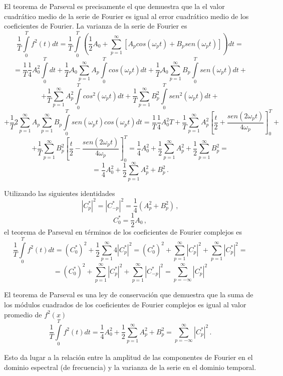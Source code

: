 \documentclass[
]{agujournal2019}
\begin{document}
El teorema de Parseval es precisamente el que demuestra que la el valor
cuadrático medio de la serie de Fourier es igual al error cuadrático
medio de los coeficientes de Fourier. La varianza de la serie de Fourier
es \[\frac{1}{T}\int\limits^{T}_0 f^2(t) dt=\frac{1}{T}\int\limits^{T}_0
\left(\frac{1}{2}A_0 +\sum\limits^\infty_{p=1}[A_p cos(\omega_p t) + B_p sen(\omega_p t)]\right) dt=\]
\[=\frac{1}{T}\frac{1}{4} A^2_0 \int\limits^{T}_0 dt + \frac{1}{T}A_0 \sum\limits^\infty_{p=1} A_p \int\limits^{T}_0 cos(\omega_p t)dt + \frac{1}{T}A_0\sum\limits^\infty_{p=1}B_p \int\limits^{T}_0 sen(\omega_p t)dt +\]
\[+\frac{1}{T}\sum\limits^\infty_{p=1}A^2_p \int\limits^{T}_0 cos^2(\omega_p t)dt +
\frac{1}{T}\sum\limits^\infty_{p=1}B^2_p \int\limits^{T}_0 sen^2(\omega_p t)dt+\]
\[+\frac{1}{T}2\sum\limits^\infty_{p=1}A_p \sum\limits^\infty_{p=1}B_p\int\limits^{T}_0 sen(\omega_p t)cos(\omega_p t)dt=
\frac{1}{T}\frac{1}{4}A^2_0 T + \frac{1}{T}\sum\limits^\infty_{p=1}A^2_p\left[ \frac{t}{2} + \frac{sen(2\omega_p t)}{4\omega_p}\right]^T_0+\]
\[+\frac{1}{T}\sum\limits^\infty_{p=1}B^2_p\left[ \frac{t}{2} - \frac{sen(2\omega_p t)}{4\omega_p}\right]^T_0=
\frac{1}{4}A^2_0 + \frac{1}{2}\sum\limits^\infty_{p=1}A_p^2 + \frac{1}{2}\sum\limits^\infty_{p=1}B_p^2=\]
\[=\frac{1}{4}A^2_0 + \frac{1}{2}\sum\limits^\infty_{p=1} A_p^2 + B_p^2\,.\]

Utilizando las siguientes identidades
\[|C^*_p|^2=|C^*_{-p}|^2=\frac{1}{4}(A_p^2 + B_p^2)\,,\]
\[C^*_0=\frac{1}{2}A_0\,,\] el teorema de Parseval en términos de los
coeficientes de Fourier complejos es
\[\frac{1}{T}\int\limits^{T}_0 f^2(t) dt=(C^*_0)^2 + \frac{1}{2}\sum\limits^\infty_{p=1} 4|C^*_p|^2=
(C^*_0)^2 + \sum\limits^\infty_{p=1} |C^*_p|^2 + \sum\limits^\infty_{p=1} |C^*_p|^2=\]
\[=(C^*_0)^2 + \sum\limits^\infty_{p=1} |C^*_p|^2 + \sum\limits^\infty_{p=1} |C^*_{-p}|^2=
\sum\limits^\infty_{p=-\infty} |C^*_p|^2\]

\newpage

\begin{framed}
El teorema de Parseval es una
ley de conservación que demuestra que la suma de los módulos cuadrados
de los coeficientes de Fourier complejos es igual al valor promedio de
$f^2(x)$
$$\frac{1}{T}\int\limits^{T}_0 f^2(t) dt=\frac{1}{4}A^2_0 + \frac{1}{2}\sum\limits^\infty_{p=1} A_p^2 + B_p^2=
\sum\limits^\infty_{p=-\infty} |C^*_p|^2\,.$$
\end{framed}

Esto da lugar a la relación entre la amplitud de las componentes de
Fourier en el dominio espectral (de frecuencia) y la varianza de la
serie en el dominio temporal.\\
\end{document}
